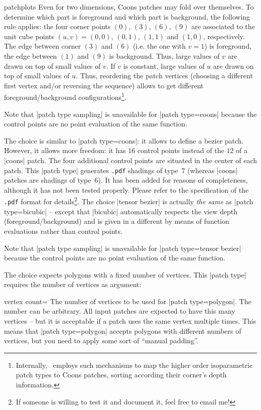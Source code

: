 {\begin{pgfplotslibrary}{patchplots}
	Even for two dimensions, Coons patches may fold over themselves. To determine which part is foreground and which part is background, the following rule applies: the four corner points $(0)$, $(3)$, $(6)$, $(9)$ are associated to the unit cube points $(u,v) = (0,0)$, $(0,1)$, $(1,1)$ and $(1,0)$, respectively. The edge between corner $(3)$ and $(6)$ (i.e. the one with $v=1$) is foreground, the edge between $(1)$ and $(9)$ is background. Thus, large values of $v$ are drawn on top of small values of $v$. If $v$ is constant, large values of $u$ are drawn on top of small values of $u$. Thus, reordering the patch vertices (choosing a different first vertex and/or reversing the sequence) allows to get different foreground/background configurations\footnote{Internally, \PGFPlots\ employs such mechanisms to map the higher order isoparametric patch types to Coons patches, sorting according their corner's depth information.}.

	Note that |patch type sampling| is unavailable for |patch type=coons| because the control points are no point evaluation of the same function.

	The choice  is similar to |patch type=coons|: it allows to define a bezier patch. However, it allows more freedom: it has $16$ control points instead of the $12$ of a |coons| patch. The four additional control points are situated in the center of each patch. This |patch type| generates \texttt{.pdf} shadings of type~$7$ (whereas |coons| patches are shadings of type~$6$). It has been added for reasons of completeness, although it has not been tested properly. Please refer to the specification of the \texttt{.pdf} format for details\footnote{If someone is willing to test it and document it, feel free to email me!}. The choice |tensor bezier| is actually \emph{the same} as |patch type=bicubic| -- except that |bicubic| automatically respects the view depth (foreground/background) and is given in a different by means of function evaluations rather than control points.
	
	Note that |patch type sampling| is unavailable for |patch type=tensor bezier| because the control points are no point evaluation of the same function.

	The choice  expects polygons with a fixed number of vertices. This |patch type| requires the number of vertices as argument:
	\begin{pgfplotskey}{vertex count=}
		The number of vertices to be used for |patch type=polygon|. The number can be arbitrary. All input patches are expected to have this many vertices -- but it is acceptable if a patch uses the same vertex multiple times. This means that |patch type=polygon| accepts polygons with different numbers of vertices, but you need to apply some sort of ``manual padding''.
		

\end{pgfplotskey}
\end{pgfplotslibrary}}
